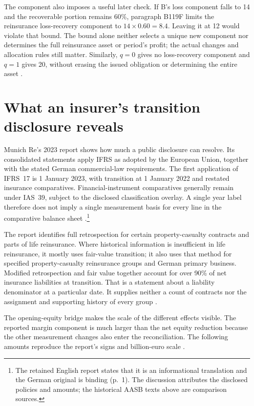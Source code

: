 The component also imposes a useful later check. If B's loss component falls
to 14 and the recoverable portion remains 60\%, paragraph B119F limits the
reinsurance loss-recovery component to $14\times0.60=8.4$. Leaving it at 12
would violate that bound. The bound alone neither selects a unique new
component nor determines the full reinsurance asset or period's profit;
the actual changes and allocation rules still matter. Similarly, $q=0$
gives no loss-recovery component and $q=1$ gives 20, without erasing the
issued obligation or determining the entire asset
\citep[paragraphs 66--67 and B119F]{aasb17}.

\clearpage
\hypertarget{munich-re-transition-disclosure}{%
\section{What an insurer's transition disclosure reveals}\label{method-insurance-munich-transition}}

Munich Re's 2023 report shows how much a public disclosure can resolve.
Its consolidated statements apply IFRS as adopted by the European Union,
together with the stated German commercial-law requirements. The first
application of IFRS~17 is 1 January 2023, with transition at 1 January 2022
and restated insurance comparatives. Financial-instrument comparatives
generally remain under IAS~39, subject to the disclosed classification
overlay. A single year label therefore does not imply a single measurement
basis for every line in the comparative balance sheet
\citep[pp.~155 and 183--184]{munichre2023annual}.\footnote{The retained
English report states that it is an informational translation and the German
original is binding (p.~1). The discussion attributes the disclosed policies
and amounts; the historical AASB texts above are comparison sources.}

The report identifies full retrospection for certain property-casualty
contracts and parts of life reinsurance. Where historical information is
insufficient in life reinsurance, it mostly uses fair-value transition; it
also uses that method for specified property-casualty reinsurance groups and
German primary business. Modified retrospection and fair value together
account for over 90\% of net insurance liabilities at transition. That is a
statement about a liability denominator at a particular date. It supplies
neither a count of contracts nor the assignment and supporting history of
every group \citep[p.~183]{munichre2023annual}.

The opening-equity bridge makes the scale of the different effects visible.
The reported margin component is much larger than the net equity reduction
because the other measurement changes also enter the reconciliation. The
following amounts reproduce the report's signs and billion-euro scale
\citep[p.~184]{munichre2023annual}.

